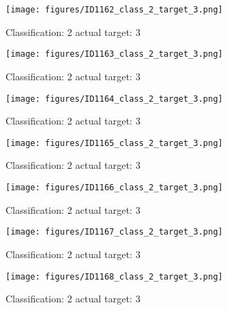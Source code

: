 \begin{figure}[h!]
\begin{center}
\texttt{[image: figures/ID1162\_class\_2\_target\_3.png]}
\end{center}
\caption{ Classification: 2 actual target: 3}
\label{fig:ID1162_class_2_target_3}
\end{figure}
\begin{figure}[h!]
\begin{center}
\texttt{[image: figures/ID1163\_class\_2\_target\_3.png]}
\end{center}
\caption{ Classification: 2 actual target: 3}
\label{fig:ID1163_class_2_target_3}
\end{figure}
\begin{figure}[h!]
\begin{center}
\texttt{[image: figures/ID1164\_class\_2\_target\_3.png]}
\end{center}
\caption{ Classification: 2 actual target: 3}
\label{fig:ID1164_class_2_target_3}
\end{figure}
\begin{figure}[h!]
\begin{center}
\texttt{[image: figures/ID1165\_class\_2\_target\_3.png]}
\end{center}
\caption{ Classification: 2 actual target: 3}
\label{fig:ID1165_class_2_target_3}
\end{figure}
\begin{figure}[h!]
\begin{center}
\texttt{[image: figures/ID1166\_class\_2\_target\_3.png]}
\end{center}
\caption{ Classification: 2 actual target: 3}
\label{fig:ID1166_class_2_target_3}
\end{figure}
\begin{figure}[h!]
\begin{center}
\texttt{[image: figures/ID1167\_class\_2\_target\_3.png]}
\end{center}
\caption{ Classification: 2 actual target: 3}
\label{fig:ID1167_class_2_target_3}
\end{figure}
\begin{figure}[h!]
\begin{center}
\texttt{[image: figures/ID1168\_class\_2\_target\_3.png]}
\end{center}
\caption{ Classification: 2 actual target: 3}
\label{fig:ID1168_class_2_target_3}
\end{figure}
